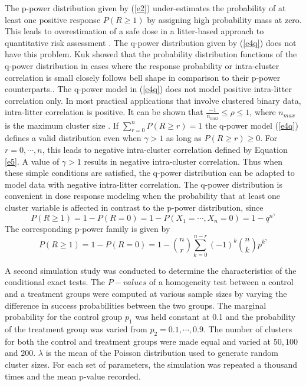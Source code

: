 \documentclass[12pt,oneside]{report}
\theoremstyle{definition}
\theoremstyle{mystyle}
\begin{document}
The p-power distribution given by   (\ref{e2}) under-estimates the  probability of at least one positive response $P(R\geq1)$ by assigning high probability mass at zero\cite{kuk2004}. This leads to overestimation of a safe dose in a litter-based approach to quantitative risk assessment \cite{kuk2004}. The q-power distribution given by  (\ref{e4q}) does not have this problem. Kuk \cite{kuk2004} showed that the  probability distribution  functions of the q-power distribution  in cases where  the  response probability or intra-cluster correlation is small  closely follows bell  shape in comparison to  their p-power counterparts.\cite{kuk2004}. The  q-power model in (\ref{e4q}) does not model positive intra-litter correlation only. In most practical applications that involve clustered binary data, intra-litter correlation  is positive. It can be shown that %
 $\frac{-1}{n_{max}}\leq \rho \leq 1$, where $n_{max}$ is the maximum cluster size \cite{icc}. If $\sum\limits_{r=0}^{n}P(R\geq r)=1$ the q-power model (\ref{e4q}) defines a valid distribution  even when  $\gamma > 1$ as long as $P(R\geq r)\geq 0$. For $r=0,\cdots,n$, this leads to negative intra-cluster correlation  defined by Equation \ref{e5}. A value of $\gamma >1$ results in negative intra-cluster correlation. Thus when these simple conditions are  satisfied, the q-power distribution can be  adapted to model data with negative intra-litter correlation.
The q-power distribution is  convenient in dose response modeling when the  probability that at least one cluster variable is   affected in contrast to the p-power distribution, since
\begin{equation}\label{e7}
P(R\geq 1)=1-P(R=0)=1-P(X_{1}=\cdots,X_{n}=0)=1-q^{n^{\gamma}}
\end{equation}
The corresponding p-power family is given by
\begin{equation}\label{e8}
P(R\geq 1)=1-P(R=0)=1-\displaystyle \binom{n}{r}\sum\limits_{k=0}^{n-r}(-1)^{k}\binom{n}{k}p^{k^{\gamma}}
\end{equation}

\vspace{5mm}

A second simulation study was conducted to determine the characteristics of the conditional exact tests. The $P-values$ of  a homogeneity test between a control and a treatment groups  were computed at  various sample sizes by varying the difference in success probabilities between the two groups.
The marginal probability for the control group   $p_{1}$ was held constant at 0.1 and the probability of the treatment group was varied from $p_{2}=0.1,\cdots,0.9$. The number of clusters  for  both the control and treatment groups were made equal and varied at $50,100$ and $200$. $\lambda$ is the mean of the Poisson distribution used to generate random cluster sizes. For each set of parameters, the simulation was repeated a thousand times and the mean p-value recorded. \\
\end{document}
